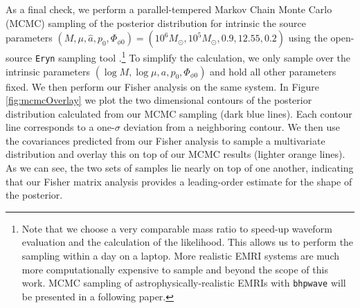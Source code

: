 \documentclass[%
 reprint,
 nofootinbib,
 amsmath,amssymb,
 aps,
 prd,
]{revtex4-2}
\begin{document}
As a final check, we perform a parallel-tempered Markov Chain Monte Carlo (MCMC) sampling of the posterior distribution for intrinsic the source parameters $(M, \mu, \hat{a}, p_0, \Phi_{\phi0}) = (10^6 M_\odot, 10^5 M_\odot, 0.9, 12.55, 0.2)$ using the open-source \texttt{Eryn} sampling tool \cite{ForeETC13, KarnETC23,Katz23}.\footnote{Note that we choose a very comparable mass ratio to speed-up waveform evaluation and the calculation of the likelihood. This allows us to perform the sampling within a day on a laptop. More realistic EMRI systems are much more computationally expensive to sample and beyond the scope of this work. MCMC sampling of astrophysically-realistic EMRIs with \texttt{bhpwave} will be presented in a following paper.} To simplify the calculation, we only sample over the intrinsic parameters $(\log M, \log \mu, a, p_0, \Phi_{\phi0})$ and hold all other parameters fixed. We then perform our Fisher analysis on the same system. In Figure \ref{fig:mcmcOverlay} we plot the two dimensional contours of the posterior distribution calculated from our MCMC sampling (dark blue lines). Each contour line corresponds to a one-$\sigma$ deviation from a neighboring contour. We then use the covariances predicted from our Fisher analysis to sample a multivariate distribution and overlay this on top of our MCMC results (lighter orange lines). As we can see, the two sets of samples lie nearly on top of one another, indicating that our Fisher matrix analysis provides a leading-order estimate for the shape of the posterior. 



\end{document}
